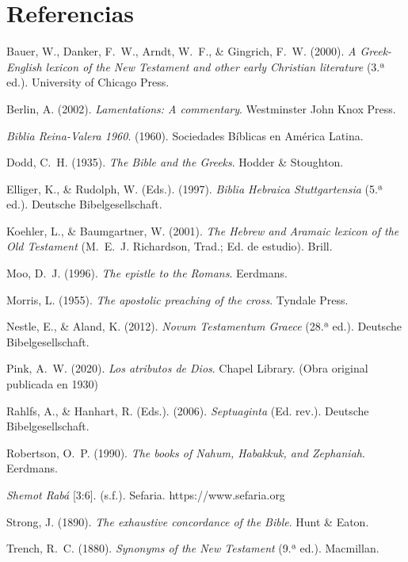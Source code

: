 \documentclass[11pt,letterpaper]{article}
\newcommand{\refapa}[1]{\par{\RaggedRight\hangindent=1.27cm\hangafter=1\noindent #1\par}\vspace{4pt}}
\begin{document}
\section*{Referencias}
\refapa{Bauer, W., Danker, F.~W., Arndt, W.~F., \& Gingrich, F.~W. (2000). \emph{A Greek-English lexicon of the New Testament and other early Christian literature} (3.ª ed.). University of Chicago Press.}
\refapa{Berlin, A. (2002). \emph{Lamentations: A commentary}. Westminster John Knox Press.}
\refapa{\emph{Biblia Reina-Valera 1960}. (1960). Sociedades Bíblicas en América Latina.}
\refapa{Dodd, C.~H. (1935). \emph{The Bible and the Greeks}. Hodder \& Stoughton.}
\refapa{Elliger, K., \& Rudolph, W. (Eds.). (1997). \emph{Biblia Hebraica Stuttgartensia} (5.ª ed.). Deutsche Bibelgesellschaft.}
\refapa{Koehler, L., \& Baumgartner, W. (2001). \emph{The Hebrew and Aramaic lexicon of the Old Testament} (M.~E.~J. Richardson, Trad.; Ed. de estudio). Brill.}
\refapa{Moo, D.~J. (1996). \emph{The epistle to the Romans}. Eerdmans.}
\refapa{Morris, L. (1955). \emph{The apostolic preaching of the cross}. Tyndale Press.}
\refapa{Nestle, E., \& Aland, K. (2012). \emph{Novum Testamentum Graece} (28.ª ed.). Deutsche Bibelgesellschaft.}
\refapa{Pink, A.~W. (2020). \emph{Los atributos de Dios}. Chapel Library. (Obra original publicada en 1930)}
\refapa{Rahlfs, A., \& Hanhart, R. (Eds.). (2006). \emph{Septuaginta} (Ed. rev.). Deutsche Bibelgesellschaft.}
\refapa{Robertson, O.~P. (1990). \emph{The books of Nahum, Habakkuk, and Zephaniah}. Eerdmans.}
\refapa{\emph{Shemot Rabá} [3:6]. (s.f.). Sefaria. https://www.sefaria.org}
\refapa{Strong, J. (1890). \emph{The exhaustive concordance of the Bible}. Hunt \& Eaton.}
\refapa{Trench, R.~C. (1880). \emph{Synonyms of the New Testament} (9.ª ed.). Macmillan.}
\end{document}

